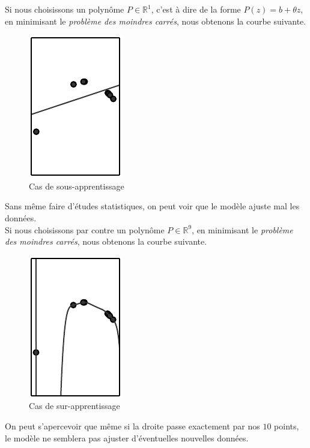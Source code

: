 \documentclass[10pt,a4paper]{report}
\begin{document}
			
			Si nous choisissons un polynôme $P \in \mathbb{R}^1$, c'est à dire de la forme $P(z) = b + \theta z$, en minimisant le \emph{problème des moindres carrés}, nous obtenons la courbe suivante.
			\begin{figure}[H]
				\begin{center}
					\includegraphics[scale=0.5]{Images/underfitting.png}
					\caption{Cas de sous-apprentissage}			
				\end{center}
			\end{figure}
			Sans même faire d'études statistiques, on peut voir que le modèle ajuste mal les données.\\
			Si nous choisissons par contre un polynôme $P \in \mathbb{R}^9$, en minimisant le \emph{problème des moindres carrés}, nous obtenons la courbe suivante.
			\begin{figure}[H]
				\begin{center}
					\includegraphics[scale=0.5]{Images/overfitting.png}
					\caption{Cas de sur-apprentissage}
				\end{center}
			\end{figure}
			On peut s'apercevoir que même si la droite passe exactement par nos $10$ points, le modèle ne semblera pas ajuster d'éventuelles nouvelles données.
			
\end{document}
